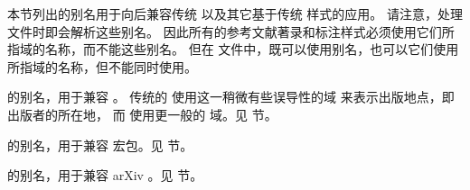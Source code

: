 
本节列出的别名用于向后兼容传统 \BibTeX 以及其它基于传统 \BibTeX 样式的应用。
请注意，处理  文件时即会解析这些别名。
因此所有的参考文献著录和标注样式必须使用它们所指域的名称，而不能这些别名。
但在  文件中，既可以使用别名，也可以它们使用所指域的名称，但不能同时使用。


\begin{fieldlist}

%


 的别名，用于兼容 \BibTeX 。
传统的 \BibTeX 使用这一稍微有些误导性的域  来表示出版地点，即出版者的所在地，
而 \biblatex 使用更一般的  域。见  节。




 的别名，用于兼容  宏包。见  节。




 的别名，用于兼容 arXiv 。见  节。




\end{fieldlist}
